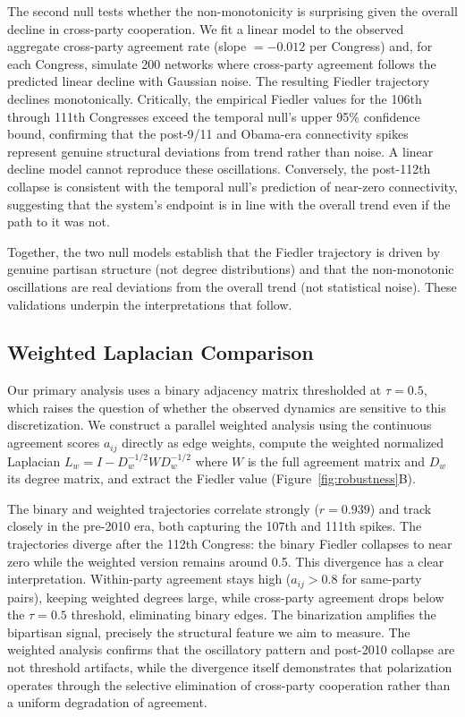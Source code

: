 \documentclass[12pt, a4paper]{article}
\begin{document}
The second null tests whether the non-monotonicity is surprising given the overall decline in cross-party cooperation. We fit a linear model to the observed aggregate cross-party agreement rate (slope $= -0.012$ per Congress) and, for each Congress, simulate 200 networks where cross-party agreement follows the predicted linear decline with Gaussian noise. The resulting Fiedler trajectory declines monotonically. Critically, the empirical Fiedler values for the 106th through 111th Congresses exceed the temporal null's upper 95\% confidence bound, confirming that the post-9/11 and Obama-era connectivity spikes represent genuine structural deviations from trend rather than noise. A linear decline model cannot reproduce these oscillations. Conversely, the post-112th collapse is consistent with the temporal null's prediction of near-zero connectivity, suggesting that the system's endpoint is in line with the overall trend even if the path to it was not.

Together, the two null models establish that the Fiedler trajectory is driven by genuine partisan structure (not degree distributions) and that the non-monotonic oscillations are real deviations from the overall trend (not statistical noise). These validations underpin the interpretations that follow.

\subsection{Weighted Laplacian Comparison}

Our primary analysis uses a binary adjacency matrix thresholded at $\tau = 0.5$, which raises the question of whether the observed dynamics are sensitive to this discretization. We construct a parallel weighted analysis using the continuous agreement scores $a_{ij}$ directly as edge weights, compute the weighted normalized Laplacian $L_w = I - D_w^{-1/2} W D_w^{-1/2}$ where $W$ is the full agreement matrix and $D_w$ its degree matrix, and extract the Fiedler value (Figure~\ref{fig:robustness}B).

The binary and weighted trajectories correlate strongly ($r = 0.939$) and track closely in the pre-2010 era, both capturing the 107th and 111th spikes. The trajectories diverge after the 112th Congress: the binary Fiedler collapses to near zero while the weighted version remains around 0.5. This divergence has a clear interpretation. Within-party agreement stays high ($a_{ij} > 0.8$ for same-party pairs), keeping weighted degrees large, while cross-party agreement drops below the $\tau = 0.5$ threshold, eliminating binary edges. The binarization amplifies the bipartisan signal, precisely the structural feature we aim to measure. The weighted analysis confirms that the oscillatory pattern and post-2010 collapse are not threshold artifacts, while the divergence itself demonstrates that polarization operates through the selective elimination of cross-party cooperation rather than a uniform degradation of agreement.
\end{document}
